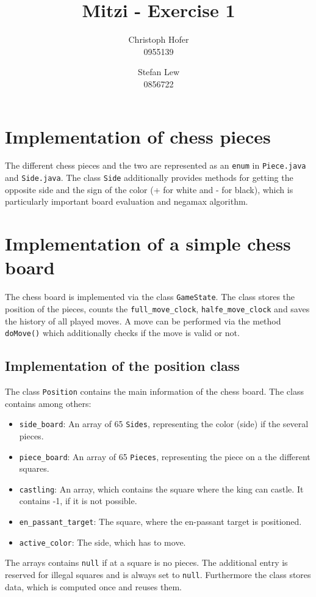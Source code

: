 \documentclass [12pt ,a4paper, naustrian]{scrartcl}
\author{Christoph Hofer\\ 0955139 \and Stefan Lew \\ 0856722}
\title{Mitzi - Exercise 1}
\theoremstyle{plain}
\theoremstyle{definition}
\theoremstyle{remark}
\begin{document}
\maketitle
\newpage
\tableofcontents
\newpage
\section{Implementation of chess pieces}
	The different chess pieces and the two are represented as an \verb+enum+ in \verb+Piece.java+ and \verb+Side.java+. The class \verb+Side+ additionally provides methods for getting the opposite side and the sign of the color (+ for white and - for black), which is particularly important board evaluation and negamax algorithm.
	
\section{Implementation of a simple chess board}
	The chess board is implemented via the class \verb+GameState+. The class stores the position of the pieces, counts the \verb+full_move_clock+, \verb+halfe_move_clock+ and saves the history of all played moves. A move can be performed via the method \verb+doMove()+ which additionally checks if the move is valid or not.	
	
	\subsection{Implementation of the position class}
		The class \verb+Position+ contains the main information of the chess board. The class contains among others:
		\begin{itemize}
			\item \verb+side_board+: An array of 65 \verb+Sides+, representing the color (side) if the several pieces.
			\item \verb+piece_board+: An array of 65 \verb+Pieces+, representing the piece on a the different squares.
			\item \verb+castling+: An array, which contains the square where the king can castle. It contains -1, if it is not possible.
			\item \verb+en_passant_target+: The square, where the en-passant target is positioned.
			\item \verb+active_color+: The side, which has to move.
			
		\end{itemize}
		The arrays contains \verb+null+ if at a square is no pieces. The additional entry    is reserved for illegal squares and is always set to \verb+null+. Furthermore the class stores data, which is computed once and reuses them.
		
\end{document}

